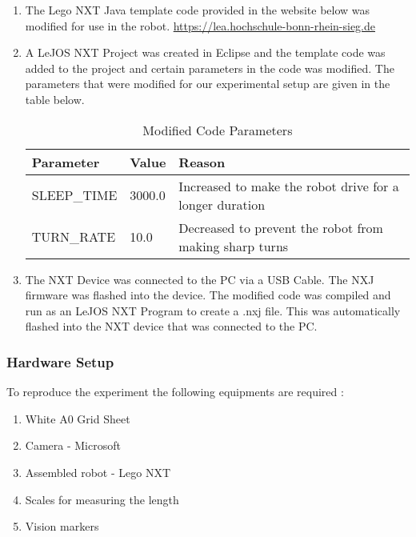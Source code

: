\documentclass[10pt,a4paper]{article}
\begin{document}
			\begin{enumerate}
				\item
				The Lego NXT Java template code provided in the website below was modified for use in the robot.
				\href{https://lea.hochschule-bonn-rhein-sieg.de/ilias.php?ref_id=571436&cmd=view&cmdClass=ilrepositorygui&cmdNode=t3&baseClass=ilrepositorygui}{https://lea.hochschule-bonn-rhein-sieg.de}
				\item
				A LeJOS NXT Project was created in Eclipse and the template code was added to the project and certain parameters in the code was modified. The parameters that were modified for our experimental setup are given in the table below.				
					
				\begin{table}[ht]				
					\centering
				\begin{tabular}{ | C{3cm} | C{3cm}|  C{7cm} |} 
					\hline
					\textbf{Parameter} & \textbf{Value} & \textbf{Reason}\\ 
					\hline
					SLEEP\_TIME   & 3000.0 &  Increased to make the robot drive for a longer duration\\ 
					\hline
					TURN\_RATE  & 10.0 & Decreased to prevent the robot from making sharp turns\\ 
					\hline
				\end{tabular}
					\caption{Modified Code Parameters}
				  	\label{Tab:Tcr}
				\end{table}
		\item
		The NXT Device was connected to the PC via a USB Cable. The NXJ firmware was flashed into the device. The modified code was compiled and run as an LeJOS NXT Program to create a .nxj file. This was automatically flashed into the NXT device that was connected to the PC.
				
				
			\end{enumerate}
			
			
	
	\subsubsection{Hardware Setup}	
To reproduce the experiment the following equipments are required :
\begin{enumerate}
    \item
    White A0 Grid Sheet
    \item
    Camera - Microsoft 
    \item
    Assembled robot - Lego NXT 
    \item
    Scales for measuring the length 
    \item
    Vision markers
\end{enumerate}
\vspace{0.5cm}
\end{document}

